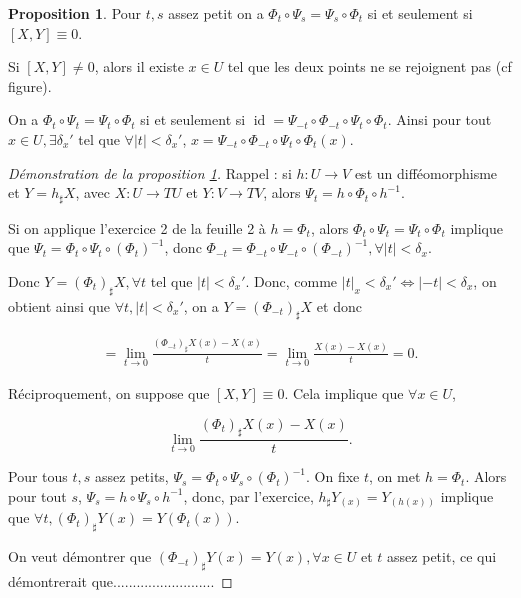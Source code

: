 \documentclass[french]{article}
\theoremstyle{definition}
\newtheorem{protoproposition}{Proposition}[section]
\newenvironment{prop}
    {\colorlet{shadecolor}{blue!5}\begin{shaded}\begin{protoproposition}}
    {\end{protoproposition}\end{shaded}}
\newcommand{\lesss}{<}
\newcommand{\less}{\lesss}
\begin{document}
\begin{prop}\label{crochet-zero}
  Pour \(t,s\) assez petit on a \(\Phi_t \circ \Psi_s = \Psi_s \circ \Phi_t\) si et seulement si \([X,Y] \equiv 0\).
\end{prop}


Si \([X,Y] \neq 0\), alors il existe \(x \in U\) tel que les deux points ne se rejoignent pas (cf figure).


On a \(\Phi_t \circ \Psi_t = \Psi_t \circ \Phi_t\) si et seulement si \(\operatorname{id} = \Psi _{-t} \circ \Phi _{-t} \circ \Psi_t \circ \Phi_t\). Ainsi pour tout \(x \in U, \exists \delta_x'\) tel que \(\forall \left\lvert t \right\rvert \less \delta_x'\),
\(x = \Psi _{-t} \circ \Phi _{-t} \circ \Psi_t \circ \Phi_t(x)\).

\begin{proof}[Démonstration de la proposition \ref{crochet-zero}]
  Rappel : si \(h : U \longrightarrow V\) est un difféomorphisme et \(Y = h _{\sharp}X\), avec \(X : U \longrightarrow T U\) et \(Y : V \longrightarrow T V\), alors \(\Psi_t = h \circ \Phi_t \circ h ^{-1}\).

  Si on applique l'exercice 2 de la feuille 2 à \(h = \Phi_t\), alors \(\Phi_t \circ \Psi_t = \Psi_t \circ \Phi_t\) implique que \(\Psi_t = \Phi_t \circ \Psi_t \circ (\Phi_t)^{-1}\), donc \(\Phi _{-t} = \Phi _{-t} \circ \Psi _{-t} \circ (\Phi _{-t})^{-1}, \forall \left\lvert t \right\rvert \less \delta_x\).

  Donc \(Y = (\Phi_t)_{\sharp}X, \forall t \) tel que \(\left\lvert t \right\rvert \less \delta_x'\). Donc, comme \(\left\lvert t \right\rvert_x \less \delta_x' \iff \left\lvert -t \right\rvert \less \delta_x\), on obtient ainsi que \(\forall t, \left\lvert t \right\rvert \less \delta_x'\), on a
  \(Y = (\Phi _{-t})_{\sharp}X\) et donc

  \begin{gather*}
    [X,Y] = \lim_{t \to 0} \frac{(\Phi _{-t})_{\sharp}X(x)-X(x)}{t} = \lim_{t \to 0} \frac{X(x)-X(x)}{t} =0.
  \end{gather*}

  Réciproquement, on suppose que \([X,Y] \equiv 0\). Cela implique que \(\forall x \in U\),

  \[\lim_{t \to 0} \frac{(\Phi_t)_{\sharp}X(x)-X(x)}{t}. \]

  Pour tous \(t,s\) assez petits, \(\Psi_s =\Phi_t \circ \Psi_s \circ (\Phi_t)^{-1}\). On fixe \(t\), on met \(h = \Phi_t\). Alors pour tout \(s\), \(\Psi_s = h \circ \Psi_s \circ h ^{-1}\), donc, par l'exercice, \(h _{\sharp}Y _{(x)} = Y _{(h(x))}\) implique que \(\forall t, (\Phi_t)_{\sharp}Y(x) = Y(\Phi_t(x))\).

  On veut démontrer que \((\Phi _{-t})_{\sharp}Y(x) = Y(x), \forall x \in U\) et \(t\) assez petit, ce qui démontrerait que..........................
\end{proof}
\end{document}
